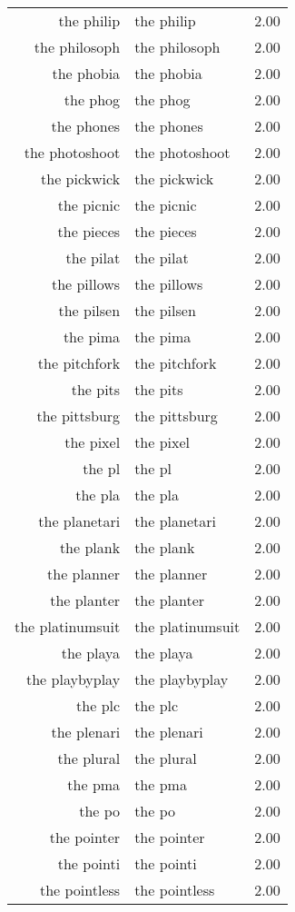 \begin{table}[ht]
\begin{tabular}{rlr}
  the philip & the philip & 2.00 \\ 
  the philosoph & the philosoph & 2.00 \\ 
  the phobia & the phobia & 2.00 \\ 
  the phog & the phog & 2.00 \\ 
  the phones & the phones & 2.00 \\ 
  the photoshoot & the photoshoot & 2.00 \\ 
  the pickwick & the pickwick & 2.00 \\ 
  the picnic & the picnic & 2.00 \\ 
  the pieces & the pieces & 2.00 \\ 
  the pilat & the pilat & 2.00 \\ 
  the pillows & the pillows & 2.00 \\ 
  the pilsen & the pilsen & 2.00 \\ 
  the pima & the pima & 2.00 \\ 
  the pitchfork & the pitchfork & 2.00 \\ 
  the pits & the pits & 2.00 \\ 
  the pittsburg & the pittsburg & 2.00 \\ 
  the pixel & the pixel & 2.00 \\ 
  the pl & the pl & 2.00 \\ 
  the pla & the pla & 2.00 \\ 
  the planetari & the planetari & 2.00 \\ 
  the plank & the plank & 2.00 \\ 
  the planner & the planner & 2.00 \\ 
  the planter & the planter & 2.00 \\ 
  the platinumsuit & the platinumsuit & 2.00 \\ 
  the playa & the playa & 2.00 \\ 
  the playbyplay & the playbyplay & 2.00 \\ 
  the plc & the plc & 2.00 \\ 
  the plenari & the plenari & 2.00 \\ 
  the plural & the plural & 2.00 \\ 
  the pma & the pma & 2.00 \\ 
  the po & the po & 2.00 \\ 
  the pointer & the pointer & 2.00 \\ 
  the pointi & the pointi & 2.00 \\ 
  the pointless & the pointless & 2.00 \\ 

\end{tabular}
\end{table}
